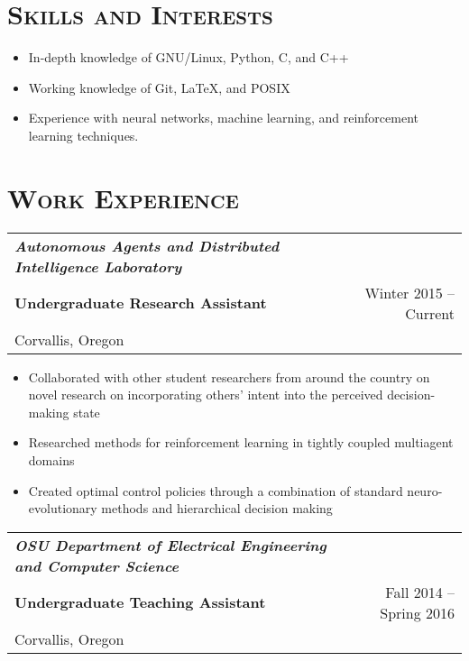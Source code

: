\documentclass[letterpaper,10pt,titlepage]{article}
\begin{document}
\section*{\textsc{Skills and Interests}}
\begin{itemize} \itemsep1pt \parskip0pt 
\item In-depth knowledge of GNU/Linux, Python, C, and C++
\item Working knowledge of Git, \LaTeX, and POSIX
\item Experience with neural networks, machine learning, and reinforcement learning techniques.
\end{itemize}

\section*{\textsc{Work Experience}}

\begin{tabularx}{\linewidth}{Xr}
\textbf{\textit{Autonomous Agents and Distributed Intelligence Laboratory}} & \\
\textbf{Undergraduate Research Assistant}          & Winter 2015 -- Current\\
Corvallis, Oregon & \\
\end{tabularx}
\begin{itemize} \itemsep1pt \parskip0pt 
\item Collaborated with other student researchers from around the country on novel research on incorporating others' intent into the perceived decision-making state
\item Researched methods for reinforcement learning in tightly coupled multiagent domains
\item Created optimal control policies through a combination of standard neuro-evolutionary methods and hierarchical decision making
\end{itemize}

\begin{tabularx}{\linewidth}{Xr}
\textbf{\textit{OSU Department of Electrical Engineering and Computer Science}} & \\
\textbf{Undergraduate Teaching Assistant}          & Fall 2014 -- Spring 2016\\
Corvallis, Oregon & \\
\end{tabularx}
\end{document}
